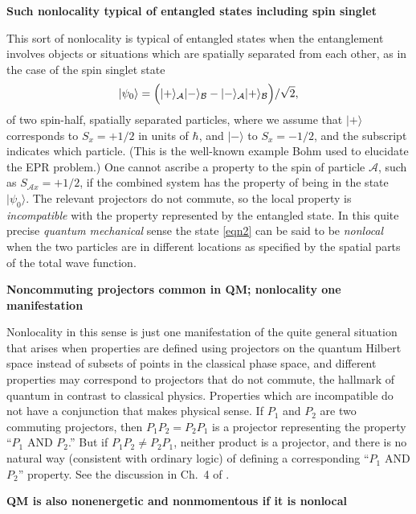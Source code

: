 \documentclass[12pt]{article} %
\def\outl#1{\par{\medskip\noindent\hspace*{.5cm}\bf
      \mathversion{bold}#1\mathversion{normal}\smallskip} }
\def\np{} \def\xa{} \def\xb{} \def\xn{} \def\xp{}
\def\outl#1{} \def\np{} \def\xa{} \def\xb{} \def\xn{} \def\xp{}
\def\outl#1{\par{\medskip\noindent\hspace*{.5cm}\bf
      \mathversion{bold}#1\mathversion{normal}\smallskip} }
\def\np{\newpage }\def\xn{\nopagebreak }\def\xp{\pagebreak }
\newcommand{\Blp}{\Bigl(}
\newcommand{\Brp}{\Bigr)}
\newcommand{\ket}[1]{|#1\rgl }
\newcommand{\rgl}{\rangle }
\newcommand{\st}{\sqrt{2}}
\newcommand{\AM}{{\mathcal A}}
\newcommand{\BM}{{\mathcal B}}
\begin{document}
\xb
\outl{Such nonlocality typical of entangled states including spin singlet}
\xa


This sort of nonlocality is typical of entangled states when the entanglement
involves objects or situations which are spatially separated from each other,
as in the case of the spin singlet state
\begin{equation}
  \ket{\psi_0} = \Blp\ket{+}_\AM\ket{-}_\BM - \ket{-}_\AM\ket{+}_\BM\Brp/\st,
\label{eqn2}
\end{equation}
of two spin-half, spatially separated particles, where we assume that
$\ket{+}$ corresponds to $S_x=+1/2$ in units of $\hbar$, and $\ket{-}$ to
$S_x=-1/2$, and the subscript indicates which particle.  (This is the
well-known example Bohm \cite{Bhm51s} used to elucidate the EPR problem.)  One
cannot ascribe a property to the spin of particle $\AM$, such as $S_{\AM
  x}=+1/2$, if the combined system has the property of being in the state
$\ket{\psi_0}$.  The relevant projectors do not commute, so the local property
is \emph{incompatible} with the property represented by the entangled state.
In this quite precise \emph{quantum mechanical} sense the state \eqref{eqn2}
can be said to be \emph{nonlocal} when the two particles are in different
locations as specified by the spatial parts of the total wave function.

\xb
\outl{Noncommuting projectors common in QM; nonlocality one manifestation}
\xa



Nonlocality in this sense is just one manifestation of the quite general
situation that arises when properties are defined using projectors on the
quantum Hilbert space instead of subsets of points in the classical phase
space, and different properties may correspond to projectors that do not
commute, the hallmark of quantum in contrast to classical physics.  Properties
which are incompatible do not have a conjunction that makes physical sense.
If $P_1$ and $P_2$ are two commuting projectors, then $P_1 P_2 = P_2 P_1$ is a
projector representing the property ``$P_1$ AND $P_2$.''  But if $P_1 P_2 \neq
P_2 P_1$, neither product is a projector, and there is no natural way
(consistent with ordinary logic) of defining a corresponding ``$P_1$ AND
$P_2$'' property.  See the discussion in Ch.~4 of \cite{Grff02c}.

\xb
\outl{QM is also nonenergetic and nonmomentous if it is nonlocal }
\xa
 
\end{document}
